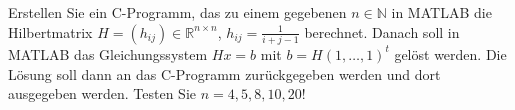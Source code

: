 \begin{aufg}
Erstellen Sie ein C-Programm, das zu einem gegebenen $n \in \mathbb{N}$ in
MATLAB die Hilbertmatrix $H=(h_{ij}) \in \mathbb{R}^{n \times n}$, $h_{ij}=\frac{1}{i+j-1}$
berechnet. Danach soll in MATLAB das Gleichungssystem $H x = b$ mit $b=H (1, \dots,
1)^t$ gel\"ost werden. Die Lösung soll dann an das C-Programm zur\"uckgegeben
werden und dort ausgegeben werden. Testen Sie $n=4,5,8,10,20$!
\end{aufg}
